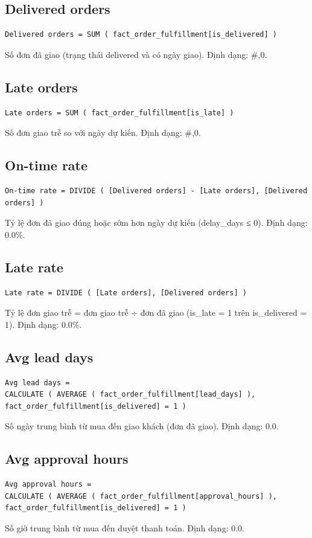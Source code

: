 \subsection*{Delivered orders}
\begin{lstlisting}[language={}]
Delivered orders = SUM ( fact_order_fulfillment[is_delivered] )
\end{lstlisting}
Số đơn đã giao (trạng thái delivered và có ngày giao). Định dạng: \#,0.

\subsection*{Late orders}
\begin{lstlisting}[language={}]
Late orders = SUM ( fact_order_fulfillment[is_late] )
\end{lstlisting}
Số đơn giao trễ so với ngày dự kiến. Định dạng: \#,0.

\subsection*{On-time rate}
\begin{lstlisting}[language={}]
On-time rate = DIVIDE ( [Delivered orders] - [Late orders], [Delivered orders] )
\end{lstlisting}
Tỷ lệ đơn đã giao đúng hoặc sớm hơn ngày dự kiến (delay\_days ≤ 0). Định dạng: 0.0\%.

\subsection*{Late rate}
\begin{lstlisting}[language={}]
Late rate = DIVIDE ( [Late orders], [Delivered orders] )
\end{lstlisting}
Tỷ lệ đơn giao trễ = đơn giao trễ ÷ đơn đã giao (is\_late = 1 trên is\_delivered = 1). Định dạng: 0.0\%.

\subsection*{Avg lead days}
\begin{lstlisting}[language={}]
Avg lead days =
CALCULATE ( AVERAGE ( fact_order_fulfillment[lead_days] ), fact_order_fulfillment[is_delivered] = 1 )
\end{lstlisting}
Số ngày trung bình từ mua đến giao khách (đơn đã giao). Định dạng: 0.0.

\subsection*{Avg approval hours}
\begin{lstlisting}[language={}]
Avg approval hours =
CALCULATE ( AVERAGE ( fact_order_fulfillment[approval_hours] ), fact_order_fulfillment[is_delivered] = 1 )
\end{lstlisting}
Số giờ trung bình từ mua đến duyệt thanh toán. Định dạng: 0.0.

